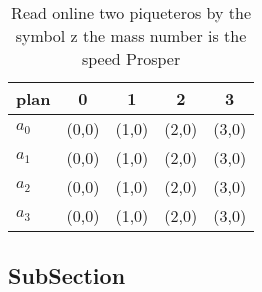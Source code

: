 \documentclass[a4paper]{article}
\begin{document}
\begin{table}
\begin{adjustbox}{width=0.7\columnwidth}
\begin{tabular}{|l|l|l|l|l|}
\hline
\textbf{plan} & \multicolumn{1}{c|}{\textbf{0}} & \multicolumn{1}{c|}{\textbf{1}} & \multicolumn{1}{c|}{\textbf{2}} & \multicolumn{1}{c|}{\textbf{3}} \\ \hline
\textbf{$a_0$}  & (0,0) & (1,0) & (2,0) & (3,0) \\ \hline
\textbf{$a_1$}  & (0,0) & (1,0) & (2,0) & (3,0) \\ \hline
\textbf{$a_2$}  & (0,0) & (1,0) & (2,0) & (3,0) \\ \hline
\textbf{$a_3$}  & (0,0) & (1,0) & (2,0) & (3,0) \\ \hline
\end{tabular}
\end{adjustbox}
\caption{Read online two piqueteros by the symbol z the mass number is the speed Prosper
}
\end{table}

\subsection{SubSection}
\end{document}

